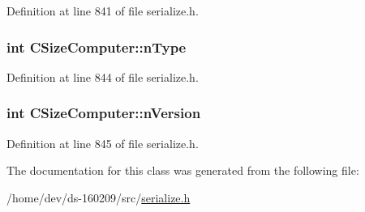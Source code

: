 Definition at line 841 of file serialize.\+h.

\hypertarget{class_c_size_computer_a1f166e95dc06a6f3718b2fac9cda18ee}{}
\subsubsection[{n\+Type}]{\setlength{\rightskip}{0pt plus 5cm}int C\+Size\+Computer\+::n\+Type}\label{class_c_size_computer_a1f166e95dc06a6f3718b2fac9cda18ee}


Definition at line 844 of file serialize.\+h.

\hypertarget{class_c_size_computer_a25759db1089e475fcba2f408633dc7bf}{}
\subsubsection[{n\+Version}]{\setlength{\rightskip}{0pt plus 5cm}int C\+Size\+Computer\+::n\+Version}\label{class_c_size_computer_a25759db1089e475fcba2f408633dc7bf}


Definition at line 845 of file serialize.\+h.



The documentation for this class was generated from the following file\+:\begin{DoxyCompactItemize}
\item 
/home/dev/ds-\/160209/src/\hyperlink{serialize_8h}{serialize.\+h}\end{DoxyCompactItemize}
